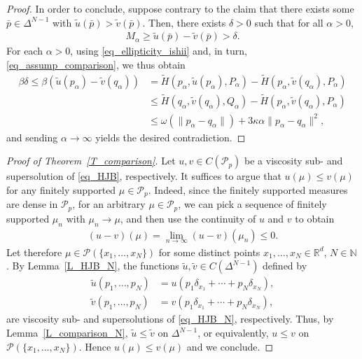 \documentclass{article}
\theoremstyle{definition}
\numberwithin{equation}{section}
\numberwithin{theorem}{section}
\newcommand{\R}{\mathbb{R}}
\newcommand{\Pc}{\mathcal{P}}
\newcommand{\N}{{\mathbb N}}
\newcommand{\Pcal}{{\mathcal P}}
\begin{document}
\begin{proof}
In order to conclude, suppose contrary to the claim that there exists some $\bar p\in\Delta^{N-1}$ with $\tilde u(\bar p)>\tilde v(\bar p)$. Then, there exists $\delta>0$ such that for all $\alpha>0$,
	\begin{align*}
		M_\alpha\ge \tilde u(\bar p)-\tilde v(\bar p)>\delta.
	\end{align*}
For each $\alpha>0$, using \eqref{eq_ellipticity_ishii} and, in turn, \eqref{eq_assump_comparison}, we thus obtain
\begin{align*}
	\beta\delta 
	\le \beta\left(\tilde u(p_\alpha)-\tilde v(q_\alpha)\right)
	&= \tilde H\left(p_\alpha,\tilde u(p_\alpha),P_\alpha\right)-\tilde H\left(p_\alpha,\tilde v(q_\alpha),P_\alpha\right)\\
	&\le \tilde H\left(q_\alpha,\tilde v(q_\alpha),Q_\alpha\right)-\tilde H\left(p_\alpha,\tilde v(q_\alpha),P_\alpha\right)\\
	&\le \omega(\|p_\alpha-q_\alpha\|)+3\kappa\alpha\|p_\alpha-q_\alpha\|^2,
\end{align*}
and sending $\alpha\to\infty$ yields the desired contradiction.
\end{proof}



\begin{proof}[Proof of Theorem~\ref{T_comparison}]
Let $u,v\in C(\Pc_p)$ be a viscosity sub- and supersolution of \eqref{eq_HJB}, respectively. 
It suffices to argue that $u(\mu)\le v(\mu)$ for any finitely supported $\mu\in\Pc_p$. Indeed, since the finitely supported measures are dense in $\Pc_p$, for an arbitrary $\mu\in\Pc_p$, we can pick a sequence of finitely supported $\mu_n$ with $\mu_n\to\mu$, and then use the continuity of $u$ and $v$ to obtain 
	\begin{align*}
 		(u-v)(\mu)=\lim_{n\to\infty}(u-v)(\mu_n)\le 0.
 	\end{align*} 	
Let therefore $\mu\in\Pcal(\{x_1,\ldots,x_N\})$ for some distinct points $x_1,\ldots,x_N\in {\R^d}$, $N\in\N$. By Lemma~\ref{L_HJB_N}, the functions $\tilde u,\tilde v\in C(\Delta^{N-1})$ defined by
\begin{align*}
\tilde u(p_1,\ldots,p_N) &= u(p_1\delta_{x_1} + \cdots + p_N\delta_{x_N}),\\
\tilde v(p_1,\ldots,p_N) &= v(p_1\delta_{x_1} + \cdots + p_N\delta_{x_N}),
\end{align*}
are viscosity sub- and supersolutions of \eqref{eq_HJB_N}, respectively. Thus, by Lemma~\ref{L_comparison_N}, $\tilde u\le\tilde v$ on $\Delta^{N-1}$, or equivalently, $u\le v$ on $\Pcal(\{x_1,\ldots,x_N\})$. Hence $u(\mu)\le v(\mu)$ and we conclude. 
\end{proof}
\end{document}
